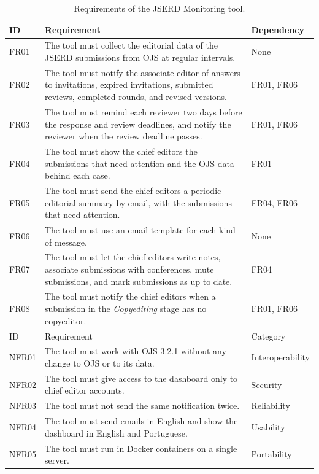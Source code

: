 \documentclass[12pt]{article}
\begin{document}
\begin{table}[!t]
\caption{Requirements of the JSERD Monitoring tool.}
\label{tbl-requirements}
\centering
\footnotesize
\begin{tabularx}{\textwidth}{@{}p{1.05cm}X>{\raggedright\arraybackslash}p{2.45cm}@{}}
\toprule
ID & Requirement & Dependency \\
\midrule
FR01 & The tool must collect the editorial data of the JSERD submissions from OJS at regular intervals. & None \\
FR02 & The tool must notify the associate editor of answers to invitations, expired invitations, submitted reviews, completed rounds, and revised versions. & FR01, FR06 \\
FR03 & The tool must remind each reviewer two days before the response and review deadlines, and notify the reviewer when the review deadline passes. & FR01, FR06 \\
FR04 & The tool must show the chief editors the submissions that need attention and the OJS data behind each case. & FR01 \\
FR05 & The tool must send the chief editors a periodic editorial summary by email, with the submissions that need attention. & FR04, FR06 \\
FR06 & The tool must use an email template for each kind of message. & None \\
FR07 & The tool must let the chief editors write notes, associate submissions with conferences, mute submissions, and mark submissions as up to date. & FR04 \\
FR08 & The tool must notify the chief editors when a submission in the \textit{Copyediting} stage has no copyeditor. & FR01, FR06 \\
\midrule
ID & Requirement & Category \\
\midrule
NFR01 & The tool must work with OJS 3.2.1 without any change to OJS or to its data. & Interoperability \\
NFR02 & The tool must give access to the dashboard only to chief editor accounts. & Security \\
NFR03 & The tool must not send the same notification twice. & Reliability \\
NFR04 & The tool must send emails in English and show the dashboard in English and Portuguese. & Usability \\
NFR05 & The tool must run in Docker containers on a single server. & Portability \\
\bottomrule
\end{tabularx}
\end{table}
\end{document}
